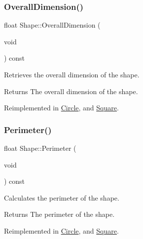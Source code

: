 \subsubsection{\texorpdfstring{OverallDimension()}{OverallDimension()}}
{\footnotesize\ttfamily float Shape\+::\+Overall\+Dimension (\begin{DoxyParamCaption}\item[{void}]{ }\end{DoxyParamCaption}) const\hspace{0.3cm}{\ttfamily [virtual]}}



Retrieves the overall dimension of the shape. 

\begin{DoxyReturn}{Returns}
The overall dimension of the shape. 
\end{DoxyReturn}


Reimplemented in \mbox{\hyperlink{class_circle_a078579746ec5d8443219f0fa2ce6373e}{Circle}}, and \mbox{\hyperlink{class_square_abf97ea232b41e2060eff7a3d8b1b60d2}{Square}}.

\mbox{\label{class_shape_a27f450f44fc4f9a444600b5df6754c5f}} 
\subsubsection{\texorpdfstring{Perimeter()}{Perimeter()}}
{\footnotesize\ttfamily float Shape\+::\+Perimeter (\begin{DoxyParamCaption}\item[{void}]{ }\end{DoxyParamCaption}) const\hspace{0.3cm}{\ttfamily [virtual]}}



Calculates the perimeter of the shape. 

\begin{DoxyReturn}{Returns}
The perimeter of the shape. 
\end{DoxyReturn}


Reimplemented in \mbox{\hyperlink{class_circle_acbb15d0cc28936ddd847802d81ba95c7}{Circle}}, and \mbox{\hyperlink{class_square_a460111c0c374f9864d00316dcfe35dba}{Square}}.

\mbox{\label{class_shape_ae7f2ceebc1f1268cd733e75746046818}} 
